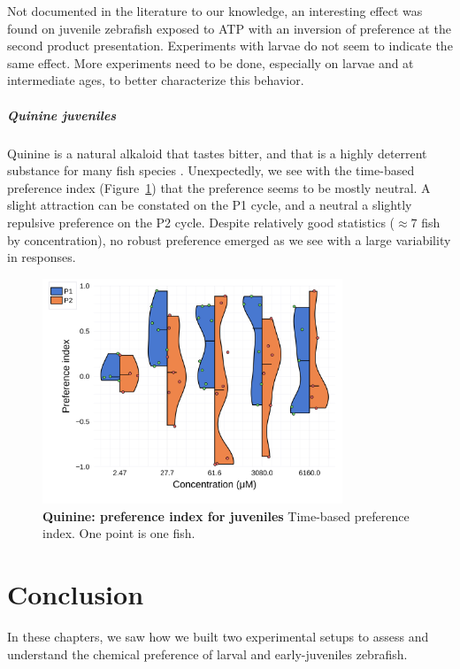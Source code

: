   Not documented in the literature to our knowledge, an interesting effect was found on juvenile zebrafish exposed to ATP with an inversion of preference at the second product presentation. Experiments with larvae do not seem to indicate the same effect. More experiments need to be done, especially on larvae and at intermediate ages, to better characterize this behavior.

    \paragraph{Quinine juveniles} Quinine is a natural alkaloid that tastes bitter, and that is a highly deterrent substance for many fish species \cite{kasumyan2003taste}. Unexpectedly, we see with the time-based preference index (Figure~\ref{dist_quinine}) that the preference seems to be mostly neutral. A slight attraction can be constated on the P1 cycle, and a neutral a slightly repulsive preference on the P2 cycle. Despite relatively good statistics ($\approx 7$ fish by concentration), no robust preference emerged as we see with a large variability in responses.
    \begin{figure}[h!]
      \centering
      \includegraphics[width=0.8\textwidth]{part_2/assets/dist_quinine.png}
      \caption{\textbf{Quinine: preference index for juveniles} Time-based preference index. One point is one fish. }
      \label{dist_quinine}
    \end{figure}

  \chapter{Conclusion}
\label{discussion}
  In these chapters, we saw how we built two experimental setups to assess and understand the chemical preference of larval and early-juveniles zebrafish.

